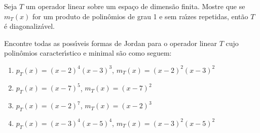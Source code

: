 \documentclass[12pt]{exam}
\begin{document}
\begin{exercicio}
  Seja $T$ um operador linear sobre um espa\c{c}o de dimens\~ao finita. Mostre que se $m_T(x)$ for um produto de polin\^omios de grau 1 e sem ra{\'\i}zes repetidas, ent\~ao $T$ \'e diagonaliz\'avel.
\end{exercicio}

\begin{exercicio}
  Encontre todas as poss{\'\i}veis formas de Jordan para o operador linear $T$ cujo polin\^omios caracter{\'\i}stico e minimal s\~ao como seguem:
  \begin{enumerate}[label=({\alph*})]
    \item $p_T(x) = (x - 2)^4(x - 3)^3$, $m_T(x) = (x - 2)^2(x - 3)^2$
    \item $p_T(x) = (x - 7)^5$, $m_T(x) = (x - 7)^2$
    \item $p_T(x) = (x - 2)^7$, $m_T(x) = (x - 2)^3$
    \item $p_T(x) = (x - 3)^4(x - 5)^4$, $m_T(x) = (x - 3)^2(x - 5)^2$
  \end{enumerate}
  \begin{solucao}
\end{solucao}
\end{exercicio}
\end{document}
